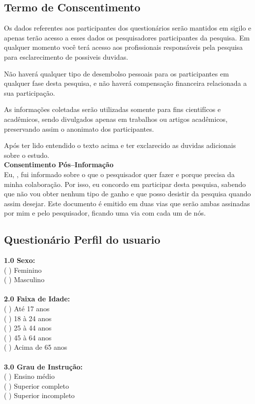 \subsection{Termo de Conscentimento}

Os dados referentes aos participantes dos questionários serão mantidos em sigilo e apenas terão acesso a esses dados os pesquisadores participantes da pesquisa.	
Em qualquer momento você terá acesso aos profissionais responsáveis pela pesquisa para esclarecimento de possiveis duvidas.

Não haverá qualquer tipo de desembolso pessoais para os participantes em qualquer fase desta pesquisa, e não haverá compensação financeira relacionada a sua participação.

As informações coletadas serão utilizadas somente para fins cientifícos e acadêmicos, sendo divulgados apenas em trabalhos ou artigos acadêmicos, preservando assim o anonimato dos participantes.
	
Após ter lido entendido o texto acima e ter exclarecido as duvidas adicionais sobre o estudo. \\


\textbf{Consentimento Pós–Informação} \\

Eu,                        , fui informado
sobre o que o pesquisador quer fazer e porque precisa da minha colaboração.
 Por isso, eu concordo em participar desta pesquisa, sabendo que não vou obter nenhum tipo de ganho
e que posso desistir da pesquisa quando assim desejar. Este documento é emitido em duas vias que serão ambas
assinadas por mim e pelo pesquisador, ficando uma via com cada um de nós.


\subsection{Questionário Perfil do usuario}


\textbf{1.0 Sexo:}
	\\
	  ( ) Feminino \\
	  ( ) Masculino\\
	\\
\textbf{2.0 Faixa de Idade:}
	\\
	  ( ) Até 17 anos\\
	  ( ) 18 à 24 anos\\
	  ( ) 25 à 44 anos\\
	  ( ) 45 à 64 anos\\
	  ( ) Acima de 65 anos\\
	\\
\textbf{3.0 Grau de Instrução:}
	\\
	  ( ) Ensino médio\\
	  ( ) Superior completo\\
	  ( ) Superior incompleto\\
	\\

